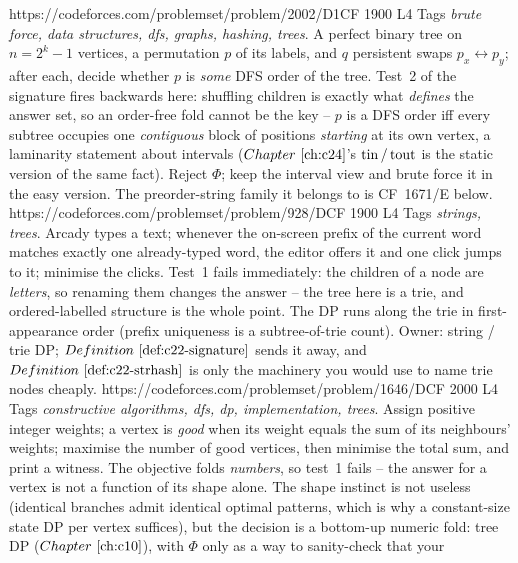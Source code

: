 \begin{mixedset}
    {https://codeforces.com/problemset/problem/2002/D1}{CF 1900 L4}
    {Tags \emph{brute force, data structures, dfs, graphs, hashing, trees}. A perfect
     binary tree on \(n=2^k-1\) vertices, a permutation \(p\) of its labels, and \(q\)
     persistent swaps \(p_x\!\leftrightarrow\!p_y\); after each, decide whether \(p\) is
     \emph{some} DFS order of the tree. Test~2 of the signature fires backwards here:
     shuffling children is exactly what \emph{defines} the answer set, so an order-free
     fold cannot be the key -- \(p\) is a DFS order iff every subtree occupies one
     \emph{contiguous} block of positions \emph{starting} at its own vertex, a laminarity
     statement about intervals (\(\chref{c24}\)'s \(\operatorname{tin}/\operatorname{tout}\) is the static version of
     the same fact). Reject \(\Phi\); keep the interval view and brute force it in the easy
     version. The preorder-string family it belongs to is CF~1671/E below.}
    {https://codeforces.com/problemset/problem/928/D}{CF 1900 L4}
    {Tags \emph{strings, trees}. Arcady types a text; whenever the on-screen prefix of the
     current word matches exactly one already-typed word, the editor offers it and one
     click jumps to it; minimise the clicks. Test~1 fails immediately: the children of a
     node are \emph{letters}, so renaming them changes the answer -- the tree here is a
     trie, and ordered-labelled structure is the whole point. The DP runs along the trie in
     first-appearance order (prefix uniqueness is a subtree-of-trie count). Owner: string
     / trie DP; \(\defref{c22-signature}\) sends it away, and \(\defref{c22-strhash}\) is
     only the machinery you would use to name trie nodes cheaply.}
    {https://codeforces.com/problemset/problem/1646/D}{CF 2000 L4}
    {Tags \emph{constructive algorithms, dfs, dp, implementation, trees}. Assign positive
     integer weights; a vertex is \emph{good} when its weight equals the sum of its
     neighbours' weights; maximise the number of good vertices, then minimise the total
     sum, and print a witness. The objective folds \emph{numbers}, so test~1 fails -- the
     answer for a vertex is not a function of its shape alone. The shape instinct is not
     useless (identical branches admit identical optimal patterns, which is why a
     constant-size state DP per vertex suffices), but the decision is a bottom-up numeric
     fold: tree DP (\(\chref{c10}\)), with \(\Phi\) only as a way to sanity-check that your
}
\end{mixedset}
